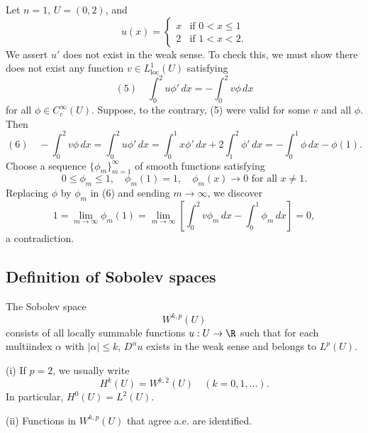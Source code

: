 \begin{example}
\label{ex:weak-derivative-nonexistence-example}
Let $n = 1$, $U = (0,2)$, and
$$u(x) = \begin{cases} x & \text{if } 0 < x \le 1 \\ 2 & \text{if } 1 < x < 2. \end{cases}$$
We assert $u'$ does not exist in the weak sense. To check this, we must show there does not exist any function $v \in L^1_{\text{loc}}(U)$ satisfying
$$(5) \quad \int_0^2 u\phi' \, dx = -\int_0^2 v\phi \, dx$$
for all $\phi \in C_c^\infty(U)$. Suppose, to the contrary, (5) were valid for some $v$ and all $\phi$. Then
$$(6) \quad -\int_0^2 v\phi \, dx = \int_0^2 u\phi' \, dx = \int_0^1 x\phi' \, dx + 2\int_1^2 \phi' \, dx = -\int_0^1 \phi \, dx - \phi(1).$$
Choose a sequence $\{\phi_m\}_{m=1}^\infty$ of smooth functions satisfying
$$0 \le \phi_m \le 1, \quad \phi_m(1) = 1, \quad \phi_m(x) \to 0 \text{ for all } x \ne 1.$$
Replacing $\phi$ by $\phi_m$ in (6) and sending $m \to \infty$, we discover
$$1 = \lim_{m \to \infty} \phi_m(1) = \lim_{m \to \infty} \left[\int_0^2 v\phi_m \, dx - \int_0^1 \phi_m \, dx\right] = 0,$$
a contradiction.
\end{example}

\subsection{Definition of Sobolev spaces}

\begin{definition}
\label{def:sobolev-space-wkp}
The Sobolev space
$$W^{k,p}(U)$$
consists of all locally summable functions $u : U \to \R$ such that for each multiindex $\alpha$ with $|\alpha| \le k$, $D^\alpha u$ exists in the weak sense and belongs to $L^p(U)$.
\end{definition}

\begin{remark}
\label{rem:hk-notation-identification}
(i) If $p = 2$, we usually write
$$H^k(U) = W^{k,2}(U) \quad (k = 0, 1, \ldots).$$
In particular, $H^0(U) = L^2(U)$.

(ii) Functions in $W^{k,p}(U)$ that agree a.e. are identified.
\end{remark}

